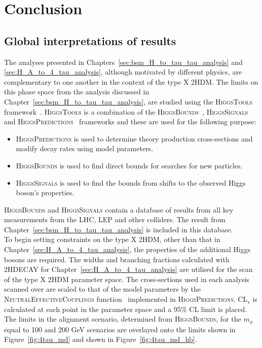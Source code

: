 \chapter{Conclusion}
\label{sec:conclusion}

\section{Global interpretations of results}

The analyses presented in Chapters~\ref{sec:bsm_H_to_tau_tau_analysis} and \ref{sec:H_A_to_4_tau_analysis}, although motivated by different physics, are complementary to one another in the context of the type X \ac{2HDM}.
The limits on this phase space from the analysis discussed in Chapter~\ref{sec:bsm_H_to_tau_tau_analysis}, are studied using the \textsc{HiggsTools} framework~\cite{Bahl:2022igd}.
\textsc{HiggsTools} is a combination of the \textsc{HiggsBounds}~\cite{Bechtle:2020pkv}, \textsc{HiggsSignals}~\cite{Bechtle:2020uwn} and \textsc{HiggsPredictions}~\cite{Bahl:2022igd} frameworks and these are used for the following purpose:

\begin{itemize}
\item \textsc{HiggsPredictions} is used to determine theory production cross-sections and modify decay rates using model parameters.
\item \textsc{HiggsBounds} is used to find direct bounds for searches for new particles.
\item \textsc{HiggsSignals} is used to find the bounds from shifts to the observed Higgs boson's properties.
\end{itemize}

\textsc{HiggsBounds} and \textsc{HiggsSignals} contain a database of results from all key measurements from the \ac{LHC}, \ac{LEP} and other colliders.
The result from Chapter~\ref{sec:bsm_H_to_tau_tau_analysis} is included in this database. \\

To begin setting constraints on the type X \ac{2HDM}, other than that in Chapter~\ref{sec:H_A_to_4_tau_analysis}, the properties of the additional Higgs bosons are required.
The widths and branching fractions calculated with \textsc{2HDECAY} for Chapter~\ref{sec:H_A_to_4_tau_analysis} are utilised for the scan of the type X 2HDM parameter space.
The cross-sections used in each analysis scanned over are scaled to that of the model parameters by the \textsc{NeutralEffectiveCouplings} function~\cite{Bechtle:2020pkv} implemented in \textsc{HiggsPredictions}.
CL$_s$ is calculated at each point in the parameter space and a 95\% \ac{CL} limit is placed.
The limits in the alignment scenario, determined from \textsc{HiggsBounds}, for the $m_{\phi}$ equal to 100 and 200 GeV scenarios are overlayed onto the limits shown in Figure~\ref{fig:4tau_md} and shown in Figure~\ref{fig:4tau_md_hb}. \\

